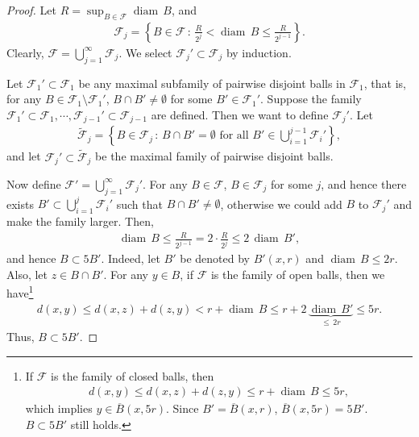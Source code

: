 \documentclass[11pt]{book}
\theoremstyle{definition}
\numberwithin{equation}{chapter}
\def\diam{{\operatorname{diam}\,}}
\begin{document}
\begin{proof}
Let $R = \sup_{B \in \mathcal{F}} \diam B$, and 
\begin{align*}
    \mathcal{F}_j = \left\{B \in \mathcal{F} \,:\, \frac{R}{2^j} < \diam B \leq \frac{R}{2^{j-1}} \right\}.
\end{align*}
Clearly, $\mathcal{F} = \bigcup^\infty_{j=1} \mathcal{F}_j$. We select $\mathcal{F}_j' \subset \mathcal{F}_j$ by induction. 

Let $\mathcal{F}_1' \subset \mathcal{F}_1$ be any maximal subfamily of pairwise disjoint balls in $\mathcal{F}_1$, that is, for any $B \in \mathcal{F}_1 \setminus \mathcal{F}_1'$, $B \cap B' \neq \emptyset$ for some $B' \in \mathcal{F}_1'$. Suppose the family $\mathcal{F}_1' \subset \mathcal{F}_1, \cdots, \mathcal{F}_{j-1}' \subset \mathcal{F}_{j-1}$ are defined. Then we want to define $\mathcal{F}_j'$. Let 
\begin{align*}
    \widetilde{\mathcal{F}}_j = \left\{ B \in \mathcal{F}_j \,:\, B \cap B' = \emptyset \,\, \text{for all} \,\, B' \in \bigcup^{j-1}_{i=1} \mathcal{F}_i' \right\},
\end{align*}
and let $\mathcal{F}_j' \subset \widetilde{\mathcal{F}}_j$ be the maximal family of pairwise disjoint balls. 

Now define $\mathcal{F}' = \bigcup^\infty_{j=1} \mathcal{F}_j'$. For any $B \in \mathcal{F}$, $B \in \mathcal{F}_j$ for some $j$, and hence there exists $B' \subset \bigcup^{j}_{i=1} \mathcal{F}_i'$ such that $B \cap B' \neq \emptyset$, otherwise we could add $B$ to $\mathcal{F}_j'$ and make the family larger. Then,
\begin{align*}
    \diam B \leq \frac{R}{2^{j-1}} = 2 \cdot \frac{R}{2^j} \leq 2 \, \diam B',
\end{align*}
and hence $B \subset 5B'$. Indeed, let $B'$ be denoted by $B'(x,r)$ and $\diam B \leq 2r$. Also, let $z \in B \cap B'$. For any $y \in B$, if $\mathcal{F}$ is the family of open balls, then we have\footnote{If $\mathcal{F}$ is the family of closed balls, then
\begin{align*}
    d(x,y) \leq d(x,z) + d(z,y) \leq r + \diam B \leq 5r,
\end{align*}
which implies $y \in \overline{B}(x,5r)$. Since $B' = \overline{B}(x,r)$, $\overline{B}(x,5r) = 5B'$. $B \subset 5B'$ still holds.}
\begin{align*}
    d(x,y) \leq d(x,z) + d(z,y) < r + \diam B \leq r + 2\, \underbrace{\diam B'}_{\leq \, 2r} \leq 5r.
\end{align*}
Thus, $B \subset 5B'$.
\end{proof}
\end{document}
